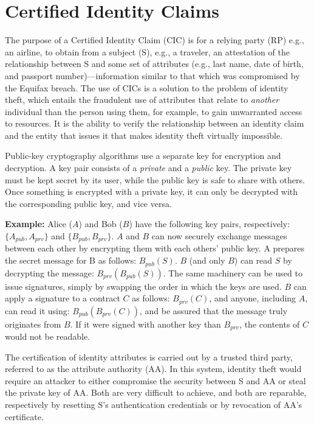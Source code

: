\documentclass[conference]{IEEEtran}
\begin{document}
\section{Certified Identity Claims}
 The purpose of a Certified Identity Claim (CIC) is for a relying party ({\sf RP}) e.g., an airline, to obtain from a subject ({\sf S}), e.g., a traveler, an attestation of the relationship between {\sf S} and some set of attributes (e.g., last name, date of birth, and passport number)---information similar to that which was compromised by the Equifax breach. The use of CICs is a solution to the problem of identity theft, which entails the fraudulent use of attributes that relate to \emph{another} individual than the person using them, for example, to gain unwarranted access to resources. It is the ability to verify the relationship between an identity claim and the entity that issues it that makes identity theft virtually impossible. \\

\begin{tcolorbox}[title={\sf Sidebar: Encryption and Digital Signatures}, title filled]
Public-key cryptography algorithms use a separate key for encryption and decryption. A key pair consists of a \emph{private} and a \emph{public} key. The private key must be kept secret by its user, while the public key is safe to share with others. Once something is encrypted with a private key, it can only be decrypted with the corresponding public key, and vice versa. 

{\bf Example:} Alice ($A$) and Bob ($B$) have the following key pairs, respectively: $\{A_{pub}, A_{prv}\}$ and $\{B_{pub}, B_{prv}\}$. $A$ and $B$ can now securely exchange messages between each other by encrypting them with each others' public key. A prepares the secret message for B as follows: ${B_{pub}(S)}$. $B$ (and only $B$) can read $S$ by decrypting the message: $B_{prv}(B_{pub}(S))$. The same machinery can be used to issue signatures, simply by swapping the order in which the keys are used. $B$ can apply a signature to a contract $C$ as follows: $B_{prv}(C)$, and anyone, including $A$, can read it using: $B_{pub}(B_{prv}(C))$, and be assured that the message truly originates from $B$. If it were signed with another key than $B_{prv}$, the contents of $C$ would not be readable.
\end{tcolorbox}

The certification of identity attributes is carried out by a trusted third party, referred to as the attribute authority ({\sf AA}). In this system, identity theft would require an attacker to either compromise the security between {\sf S} and {\sf AA} or steal the private key of {\sf AA}. Both are very difficult to achieve, and both are reparable, respectively by resetting {\sf S}'s authentication credentials or by revocation of {\sf AA}'s certificate.
\end{document}
